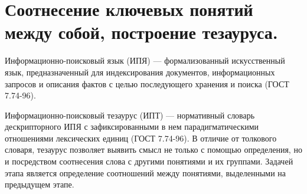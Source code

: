 
\pagebreak


\section{Соотнесение ключевых понятий между собой, построение тезауруса.}

Информационно-поисковый язык (ИПЯ) — формализованный искусственный язык, предназначенный для
индексирования документов, информационных запросов и описания фактов с целью последующего хранения
и поиска (ГОСТ 7.74-96).


Информационно-поисковый тезаурус (ИПТ) — нормативный словарь дескрипторного ИПЯ с зафиксированными
в нем парадигматическими отношениями лексических единиц (ГОСТ 7.74-96).
В отличие от толкового словаря, тезаурус позволяет выявить смысл не только с помощью определения,
но и посредством соотнесения слова с другими понятиями и их группами.
Задачей этапа является определение соотношений между понятиями, выделенными на предыдущем этапе.

\begin{figure}[ht]
    \begin{center}
    \end {center}\label{fig:figure}
\end {figure}
